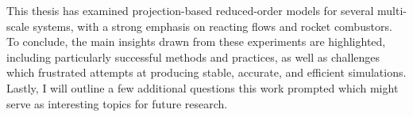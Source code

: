 This thesis has examined projection-based reduced-order models for several multi-scale systems, with a strong emphasis on reacting flows and rocket combustors. To conclude, the main insights drawn from these experiments are highlighted, including particularly successful methods and practices, as well as challenges which frustrated attempts at producing stable, accurate, and efficient simulations. Lastly, I will outline a few additional questions this work prompted which might serve as interesting topics for future research.
